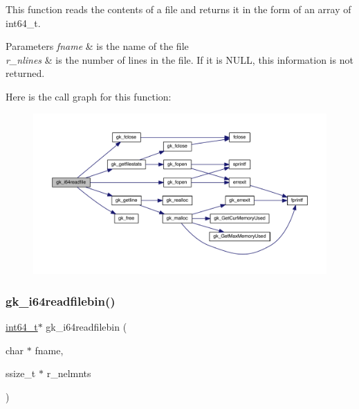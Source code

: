 This function reads the contents of a file and returns it in the form of an array of int64\+\_\+t. 
\begin{DoxyParams}{Parameters}
{\em fname} & is the name of the file \\
\hline
{\em r\+\_\+nlines} & is the number of lines in the file. If it is N\+U\+LL, this information is not returned. \\
\hline
\end{DoxyParams}
Here is the call graph for this function\+:\nopagebreak
\begin{figure}[H]
\begin{center}
\leavevmode
\includegraphics[width=350pt]{a00855_a8cb19aa95a831aa745f6e04e1cc0b204_cgraph}
\end{center}
\end{figure}
\mbox{\label{a00855_aca460764497638a612f886a089662416}} 
\subsubsection{\texorpdfstring{gk\+\_\+i64readfilebin()}{gk\_i64readfilebin()}}
{\footnotesize\ttfamily \hyperlink{a00119_a67a9885ef4908cb72ce26d75b694386c}{int64\+\_\+t}$\ast$ gk\+\_\+i64readfilebin (\begin{DoxyParamCaption}\item[{char $\ast$}]{fname,  }\item[{ssize\+\_\+t $\ast$}]{r\+\_\+nelmnts }\end{DoxyParamCaption})}

